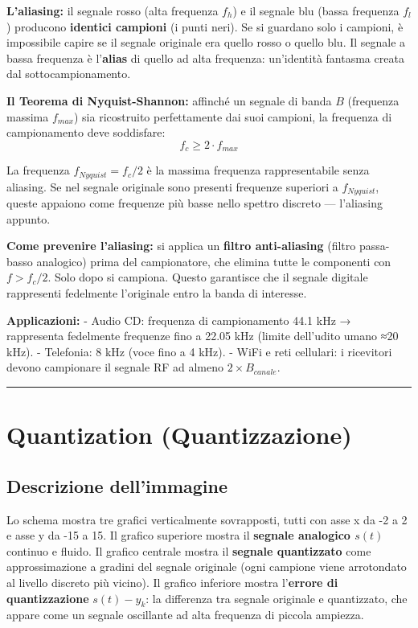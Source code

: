 \documentclass[
  italian,
  openany]{book}
\begin{document}
\textbf{L'aliasing:} il segnale rosso (alta frequenza \(f_h\)) e il
segnale blu (bassa frequenza \(f_l\)) producono \textbf{identici
campioni} (i punti neri). Se si guardano solo i campioni, è impossibile
capire se il segnale originale era quello rosso o quello blu. Il segnale
a bassa frequenza è l'\textbf{alias} di quello ad alta frequenza:
un'identità fantasma creata dal sottocampionamento.

\textbf{Il Teorema di Nyquist-Shannon:} affinché un segnale di banda
\(B\) (frequenza massima \(f_{max}\)) sia ricostruito perfettamente dai
suoi campioni, la frequenza di campionamento deve soddisfare:
\[f_c \geq 2 \cdot f_{max}\]

La frequenza \(f_{Nyquist} = f_c/2\) è la massima frequenza
rappresentabile senza aliasing. Se nel segnale originale sono presenti
frequenze superiori a \(f_{Nyquist}\), queste appaiono come frequenze
più basse nello spettro discreto --- l'aliasing appunto.

\textbf{Come prevenire l'aliasing:} si applica un \textbf{filtro
anti-aliasing} (filtro passa-basso analogico) prima del campionatore,
che elimina tutte le componenti con \(f > f_c/2\). Solo dopo si
campiona. Questo garantisce che il segnale digitale rappresenti
fedelmente l'originale entro la banda di interesse.

\textbf{Applicazioni:} - Audio CD: frequenza di campionamento 44.1 kHz →
rappresenta fedelmente frequenze fino a 22.05 kHz (limite dell'udito
umano ≈20 kHz). - Telefonia: 8 kHz (voce fino a 4 kHz). - WiFi e reti
cellulari: i ricevitori devono campionare il segnale RF ad almeno
\(2 \times B_{canale}\).

\begin{center}\rule{0.5\linewidth}{0.5pt}\end{center}

\section{Quantization
(Quantizzazione)}\label{quantization-quantizzazione}

\subsection{Descrizione
dell'immagine}\label{descrizione-dellimmagine-17}

Lo schema mostra tre grafici verticalmente sovrapposti, tutti con asse x
da -2 a 2 e asse y da -15 a 15. Il grafico superiore mostra il
\textbf{segnale analogico \(s(t)\)} continuo e fluido. Il grafico
centrale mostra il \textbf{segnale quantizzato} come approssimazione a
gradini del segnale originale (ogni campione viene arrotondato al
livello discreto più vicino). Il grafico inferiore mostra
l'\textbf{errore di quantizzazione} \(s(t) - y_k\): la differenza tra
segnale originale e quantizzato, che appare come un segnale oscillante
ad alta frequenza di piccola ampiezza.
\end{document}

